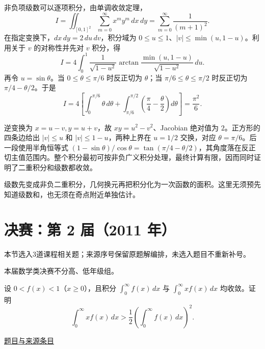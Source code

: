\documentclass[12pt,fontset=fandol]{ctexart}
\begin{document}
\begin{solve}\label{ans:fin01-all:8}

非负项级数可以逐项积分，由单调收敛定理，
\[
I=\iint_{[0,1]^2}\sum_{m=0}^\infty x^my^m\,dx\,dy
=\sum_{m=0}^\infty\frac1{(m+1)^2}.
\]
在指定变换下，$dx\,dy=2\,du\,dv$，积分域为
$0\le u\le1$、$|v|\le\min(u,1-u)$。利用关于 $v$ 的对称性并先对 $v$ 积分，得
\[
I=4\int_0^1\frac1{\sqrt{1-u^2}}
\arctan\frac{\min(u,1-u)}{\sqrt{1-u^2}}\,du.
\]
再令 $u=\sin\theta$。当 $0\le\theta\le\pi/6$ 时反正切为 $\theta$；当 $\pi/6\le\theta\le\pi/2$ 时反正切为 $\pi/4-\theta/2$。于是
\[
I=4\left[\int_0^{\pi/6}\theta\,d\theta
+\int_{\pi/6}^{\pi/2}\left(\frac\pi4-\frac\theta2\right)d\theta\right]
=\frac{\pi^2}{6}.
\]

逆变换为 $x=u-v,y=u+v$，故 $xy=u^2-v^2$、Jacobian 绝对值为 $2$。正方形的四条边给出 $|v|\le u$ 和 $|v|\le1-u$，两种上界在 $u=1/2$ 交换，对应 $\theta=\pi/6$。后一段使用半角恒等式 $(1-\sin\theta)/\cos\theta=\tan(\pi/4-\theta/2)$，其角度落在反正切主值范围内。整个积分最初可按非负广义积分处理，最终计算有限，因而同时证明了二重积分和级数都收敛。

\end{solve}

\begin{remark}[方法与条件]级数先变成非负二重积分，几何换元再把积分化为一次函数的面积。这里无须预先知道级数和，也无须在奇点附近单独估计。\end{remark}

\section{决赛：第 2 届（2011 年）}

本节选入3道课程相关题；来源序号保留原题解编排，未选入题目不重新补号。

\begin{remark}[来源说明]本届数学类决赛不分高、低年级组。\end{remark}

\begin{example}[来源序号2]\label{ex:fin02-all:2}\label{pr:fin02-all:2}

设 $0<f(x)<1$（$x\ge0$），且积分 $\int_0^\infty f(x)\,dx$ 与 $\int_0^\infty xf(x)\,dx$ 均收敛。证明
\[
\int_0^\infty xf(x)\,dx>
\frac12\left(\int_0^\infty f(x)\,dx\right)^2.
\]

\par\href{https://github.com/lzxcr/cmc-mathematics/blob/64916fa1fdbc3e444a652eca204d5669058ee321/src/problems/finals/02/02.md}{题目与来源条目}

\end{example}
\end{document}
